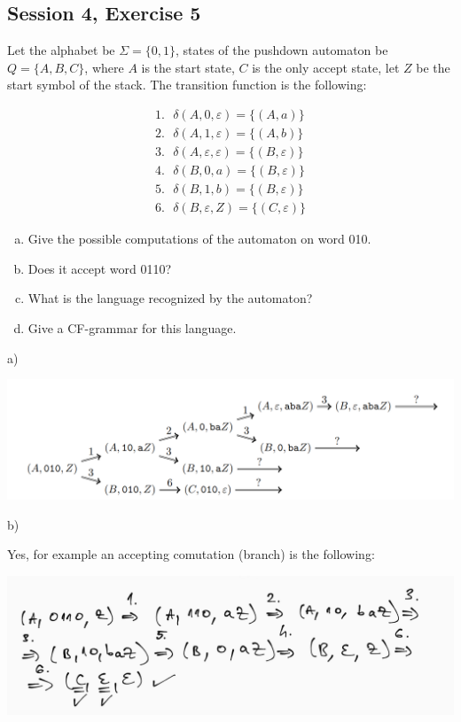 \subsection{Session 4, Exercise 5}


Let the alphabet be $\Sigma=\{0,1\}$, states of the pushdown automaton be $Q=\{A,B,C\}$, where $A$ is the start state, $C$ is the only accept state, let $Z$ be the start symbol of the stack. The transition function is the following:

\begin{align*}
    1.\text{ }\delta(A,0,\varepsilon) = \{(A,a)\}\\
    2.\text{ }\delta(A,1,\varepsilon) = \{(A, b)\}\\
    3.\text{ }\delta(A,\varepsilon,\varepsilon) = \{(B,\varepsilon)\}\\
    4.\text{ }\delta(B,0,a) = \{(B,\varepsilon)\}\\
    5.\text{ }\delta(B,1,b) = \{(B,\varepsilon)\}\\
    6.\text{ }\delta(B,\varepsilon, Z) = \{(C,\varepsilon)\}
\end{align*}

\begin{enumerate}[a)]
    \item Give the possible computations of the automaton on word 010.
    \item Does it accept word 0110?
    \item What is the language recognized by the automaton?
    \item Give a CF-grammar for this language.
\end{enumerate}


a)

\includegraphics[width=\linewidth]{04/4_5_a.png}

b)

Yes, for example an accepting comutation (branch) is the following:


\includegraphics[width=\linewidth]{04/4_5_b.png}

